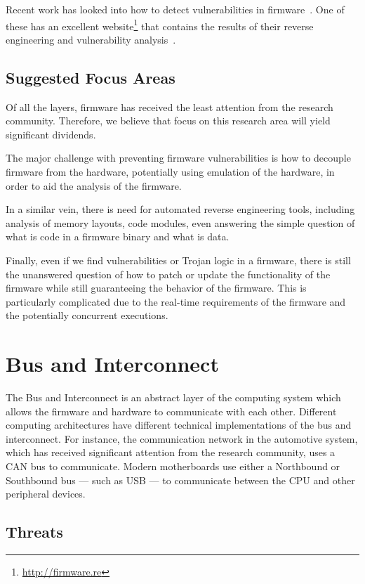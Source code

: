 \documentclass[11pt,letterpaper]{article}
\begin{document}
Recent work has looked into how to detect vulnerabilities in
firmware~\cite{davidson2013, costin2014, shoshitaishvili2015}. One of
these has an excellent website\footnote{\url{http://firmware.re}}
that contains the results of their reverse engineering and
vulnerability analysis~\cite{costin2014}.

\subsection{Suggested Focus Areas}
Of all the layers, firmware has received the least attention from the
research community. Therefore, we believe that focus on this research
area will yield significant dividends. 

The major challenge with preventing firmware vulnerabilities is how to decouple
firmware from the hardware, potentially using emulation of the
hardware, in order to aid the analysis of the firmware. 

In a similar vein, there is need for automated reverse engineering tools,
including analysis of memory layouts, code modules, even answering the
simple question of what is code in a firmware binary and what is data.

Finally, even if we find vulnerabilities or Trojan logic in a
firmware, there is still the unanswered question of how to patch or
update the functionality of the firmware while still guaranteeing the
behavior of the firmware. This is particularly complicated due to the
real-time requirements of the firmware and the potentially concurrent
executions.  

\section{Bus and Interconnect}

The Bus and Interconnect is an abstract layer of the computing system
which allows the firmware and hardware to communicate with each other.
Different computing architectures have different technical
implementations of the bus and interconnect. For instance, the
communication network in the automotive system, which has received
significant attention from the research community, uses a CAN bus to
communicate. Modern motherboards use either a Northbound or Southbound
bus --- such as USB --- to communicate between the CPU and other peripheral devices.

\subsection{Threats}
\end{document}
